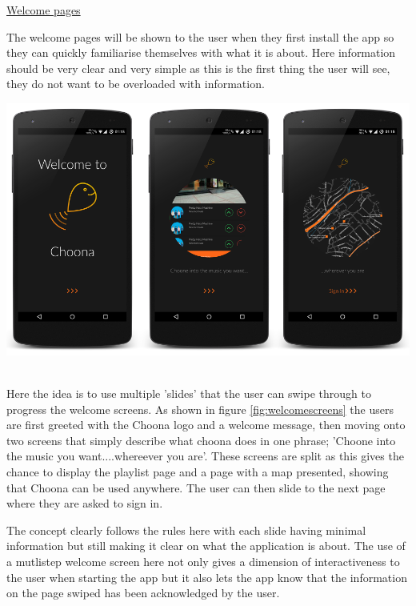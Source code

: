 \newpage

\noindent\underline{Welcome pages}\newline

The welcome pages will be shown to the user when they first install the app so they can quickly familiarise themselves with what it is about. Here information should be very clear and very simple as this is the first thing the user will see, they do not want to be overloaded with information. \\

\noindent
\begin{minipage}{\linewidth}
\centering
\includegraphics[scale=0.5]{./img/welcomeframed.png}
\label{fig:welcomescreens}
\end{minipage}\\

Here the idea is to use multiple 'slides' that the user can swipe through to progress the welcome screens. As shown in figure \ref{fig:welcomescreens} the users are first greeted with the Choona logo and a welcome message, then moving onto two screens that simply describe what choona does in one phrase; 'Choone into the music you want....whereever you are'. These screens are split as this gives the chance to display the playlist page and a page with a map presented, showing that Choona can be used anywhere. The user can then slide to the next page where they are asked to sign in. 

The concept clearly follows the rules here with each slide having minimal information but still making it clear on what the application is about. The use of a mutlistep welcome screen here not only gives a dimension of interactiveness to the user when starting the app but it also lets the app know that the information on the page swiped has been acknowledged by the user.  

